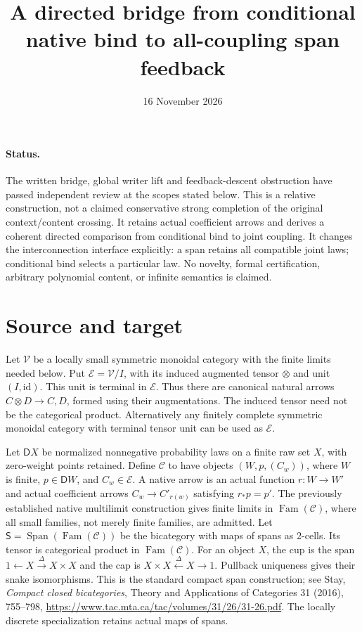 \documentclass[11pt]{article}
\title{A directed bridge from conditional native bind to all-coupling span feedback}
\date{16 November 2026}
\newcommand{\D}{\mathsf D}\newcommand{\E}{\mathcal E}\newcommand{\C}{\mathcal C}\newcommand{\F}{\operatorname{Fam}}
\begin{document}
\maketitle
\paragraph{Status.} The written bridge, global writer lift and feedback-descent obstruction have passed independent review at the scopes stated below. This is a relative construction, not a claimed conservative strong completion of the original context/content crossing. It retains actual coefficient arrows and derives a coherent directed comparison from conditional bind to joint coupling. It changes the interconnection interface explicitly: a span retains all compatible joint laws; conditional bind selects a particular law. No novelty, formal certification, arbitrary polynomial content, or infinite semantics is claimed.

\section{Source and target}
Let $\mathcal V$ be a locally small symmetric monoidal category with the finite limits needed below. Put $\E=\mathcal V/I$, with its induced augmented tensor $\otimes$ and unit $(I,\mathrm{id})$. This unit is terminal in $\E$. Thus there are canonical natural arrows $C\otimes D\to C,D$, formed using their augmentations. The induced tensor need not be the categorical product. Alternatively any finitely complete symmetric monoidal category with terminal tensor unit can be used as $\E$.

Let $\D X$ be normalized nonnegative probability laws on a finite raw set $X$, with zero-weight points retained. Define $\C$ to have objects $(W,p,(C_w))$, where $W$ is finite, $p\in\D W$, and $C_w\in\E$. A native arrow is an actual function $r:W\to W'$ and actual coefficient arrows $C_w\to C'_{r(w)}$ satisfying $r_*p=p'$. The previously established native multilimit construction gives finite limits in $\F(\C)$, where all small families, not merely finite families, are admitted. Let $\mathsf S=\operatorname{Span}(\F(\C))$ be the bicategory with maps of spans as 2-cells. Its tensor is categorical product in $\F(\C)$. For an object $X$, the cup is the span $1\leftarrow X\xrightarrow{\Delta}X\times X$ and the cap is $X\times X\xleftarrow{\Delta}X\to1$. Pullback uniqueness gives their snake isomorphisms. This is the standard compact span construction; see Stay, \emph{Compact closed bicategories}, Theory and Applications of Categories 31 (2016), 755--798, \url{https://www.tac.mta.ca/tac/volumes/31/26/31-26.pdf}. The locally discrete specialization retains actual maps of spans.
\end{document}

